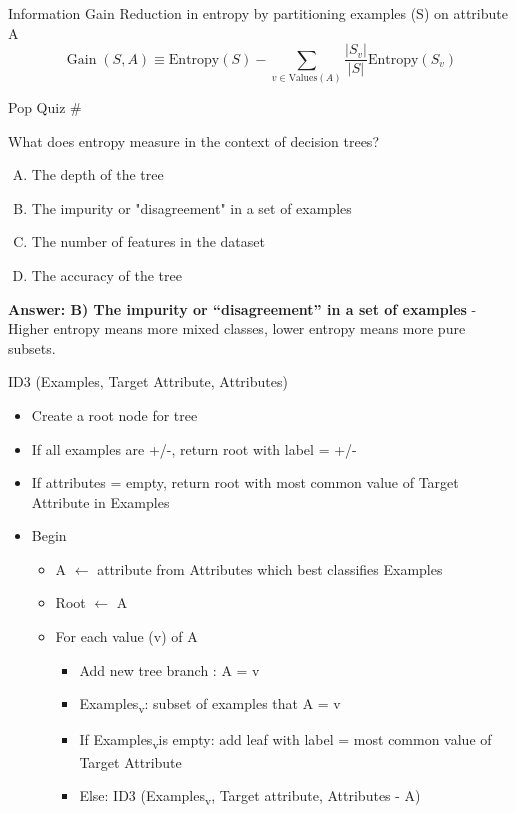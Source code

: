 \documentclass[usenames,dvipsnames]{beamer}
\begin{document}
\begin{frame}{Information Gain}
 Reduction in entropy
by partitioning examples (S) on attribute A
$$
\operatorname{Gain}(S, A) \equiv \text{Entropy}(S)-\sum_{v \in \text{Values}(A)} \frac{|S_{v}|}{|S|} \text{Entropy}(S_{v})
$$
\end{frame}

\begin{frame}{Pop Quiz \#\thepopquiz}
\begin{tcolorbox}[colback=blue!5!white,colframe=blue!75!black,title=Quick Question!]
What does entropy measure in the context of decision trees?
\begin{enumerate}[A)]
\item The depth of the tree
\item The impurity or "disagreement" in a set of examples
\item The number of features in the dataset
\item The accuracy of the tree
\end{enumerate}
\pause
\textbf{Answer: B) The impurity or ``disagreement'' in a set of examples} - Higher entropy means more mixed classes, lower entropy means more pure subsets.
\end{tcolorbox}
\end{frame}


\begin{frame}{ID3 (Examples, Target Attribute, Attributes)}
\begin{itemize}[<+->]
	\item Create a root node for tree
	\item If all examples are +/-, return root with label = +/-
	\item  If attributes = empty, return root with most common value of
	Target Attribute in Examples
	\item Begin
	\begin{itemize}[<+->]
		\item A $\leftarrow$ attribute from Attributes which best classifies
		Examples
		\item 	Root $\leftarrow$ A
		\item  For each value (v) of A
		\begin{itemize}[<+->]
			\item Add new tree branch : A = v
			\item  Examples\textsubscript{v}: subset of examples that A = v
			\item If Examples\textsubscript{v}is empty: add leaf with label = most
			common value of Target Attribute
			\item Else: ID3 (Examples\textsubscript{v}, Target attribute, Attributes - {A})
		\end{itemize}
	\end{itemize}


\end{itemize}
\end{frame}
\end{document}
